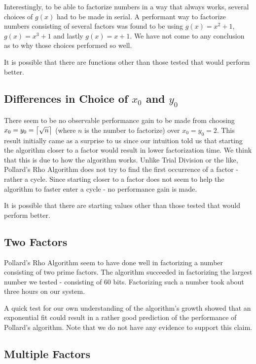 Interestingly, to be able to factorize numbers in a way that always works, several choices of $g(x)$ had to be made in serial. A performant way to factorize numbers consisting of several factors was found to be using $g(x)=x^2+1$, $g(x)=x^3+1$ and lastly $g(x)=x+1$. We have not come to any conclusion as to why those choices performed so well.

It is possible that there are functions other than those tested that would perform better.

\subsection{Differences in Choice of $x_0$ and $y_0$}

There seem to be no observable performance gain to be made from choosing $x_0=y_0=\ceil[\big]{\sqrt{n}}$ (where $n$ is the number to factorize) over $x_0=y_0=2$. This result initially came as a surprise to us since our intuition told us that starting the algorithm closer to a factor would result in lower factorization time. We think that this is due to how the algorithm works. Unlike Trial Division or the like, Pollard's Rho Algorithm does not try to find the first occurrence of a factor - rather a cycle. Since starting closer to a factor does not seem to help the algorithm to faster enter a cycle - no performance gain is made.

It is possible that there are starting values other than those tested that would perform better.

\subsection{Two Factors}

Pollard's Rho Algorithm seem to have done well in factorizing a number consisting of two prime factors. The algorithm succeeded in factorizing the largest number we tested - consisting of $60$ bits. Factorizing such a number took about three hours on our system.

A quick test for our own understanding of the algorithm's growth showed that an exponential fit could result in a rather good prediction of the performance of Pollard's algorithm. Note that we do not have any evidence to support this claim.

\subsection{Multiple Factors}

